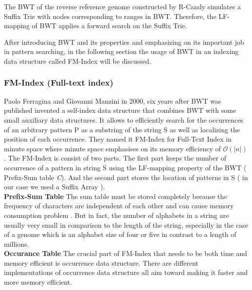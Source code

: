 \documentclass[11pt,a4paper]{report}
\begin{document}
The BWT of the reverse reference genome constructed by R-Candy simulates a Suffix 
Trie with nodes corresponding to ranges in BWT. Therefore, the LF-mapping of BWT 
applies a forward search on the Suffix Trie.

After introducing BWT and its properties and emphasizing on its important job in 
pattern searching, in the following section the usage of BWT in an indexing data 
structure called FM-Index will be discussed\cite{fmindex}. 



\subsubsection{FM-Index (Full-text index)}  
\label{FM-Index (Full-text index)}


Paolo Ferragina and Giovanni Manzini in 2000, six years after BWT was 
published invented a self-index data structure that combines BWT with 
some small auxiliary data structures. It allows to efficiently search 
for the occurrences of an arbitrary pattern P as a substring of the 
string S as well as localizing the position of each occurrence. They 
named it FM-Index for Full-Text Index in minute space where minute 
space emphasises on its memory efficiency of $\mathcal{O}(\lvert n 
\rvert)$. The FM-Index is consist of two parts. The first part keeps 
the number of occurrence of a pattern in string S using the LF-mapping 
property of the BWT ( Prefix-Sum table \emph{C}). And the second part 
stores the location of patterns in S ( in our case we used a Suffix 
Array )\cite{Wavthesis}.\\

\textbf{Prefix-Sum Table}  The sum table must be stored completely because
the frequency of characters are independent of each other and can cause 
memory consumption problem \cite{Wavthesis}. But in  fact, the number of 
alphabets in a string are usually very small in comparison to the length 
of the string, especially in the case of a genome which is an alphabet size 
of four or five in contrast to a length of millions.
\\

\textbf{Occurance Table} The crucial part of FM-Index that needs to be 
both time and memory efficient is occurrence data structure\cite{Wavthesis}.
There are different implementations of occurrence data structure all aim 
toward making it faster and more memory efficient.
\\
\end{document}
